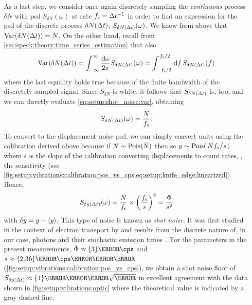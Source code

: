 As a last step, we consider once again discretely sampling the \emph{continuous} process $\delta N$ with \gls{psd} $S_{\delta N}(\omega)$ at rate $f_{\mathrm{s}}=\Delta t^{-1}$ in order to find an expression for the \gls{psd} of the discrete process $\delta N(\Delta t)$, $S_{\delta N(\Delta t)}(\omega)$.
We know from above that $\operatorname{Var}(\delta N(\Delta t)) = \bar{N}$.
On the other hand, recall from \cref{sec:speck:theory:time_series_estimation} that also
\begin{align}\label{eq:setup:shot_noise:var}
    \variance(\delta N(\dt)) = \intinf\ddf{\omega} S_{\delta N(\dt)}(\omega) = \int_{-\flatfrac{\fs}{2}}^{\flatfrac{\fs}{2}}\dd{f} S_{\delta N(\dt)}(f)
\end{align}
where the last equality holds true because of the finite bandwidth of the discretely sampled signal.
Since $S_{\delta N}$ is white, it follows that $S_{\delta N(\Delta t)}$ is, too, and we can directly evaluate \cref{eq:setup:shot_noise:var}, obtaining
\begin{equation}\label{eq:setup:shot_noise:psd}
    S_{\delta N(\Delta t)}(\omega) = \frac{\bar{N}}{f_{\mathrm{s}}}.
\end{equation}
To convert to the displacement noise \gls{psd}, we can simply convert units using the calibration derived above because if $N\sim\operatorname{Pois}(\bar{N})$ then so $y\sim\poisson(\flatfrac{\bar{N}\fs}{s})$ where $s$ is the slope of the calibration converting displacements to count rates, \ie, the sensitivity (see \cref{fig:setup:vibrations:calibration:pos_vs_cps,eq:setup:knife_edge:linearized}).
Hence,
\begin{equation}\label{eq:setup:shot_noise:noise_floor}
   S_{\delta y(\Delta t)}(\omega) = \frac{\bar{N}}{f_{\mathrm{s}}}\times\left(\frac{f_{\mathrm{s}}}{s}\right)^2 = \frac{\bar{\Phi}}{s^2}
\end{equation}
with $\delta y = y - \expval{y}$.
This type of noise is known as \emph{shot noise}.
It was first studied in the context of electron transport by \citet{Schottky1918} and results from the discrete nature of, in our case, photons and their stochastic emission times~\cite{Blanter2000}.
For the parameters in the present measurements, $\bar{\Phi}\approx\qty{3}{\mega\cps}$ and $s\approx\qty{2.36}{\mega\cps\per\micro\meter}$ (\cf \cref{fig:setup:vibrations:calibration:pos_vs_cps}), we obtain a shot noise floor of $S_{\delta y(\dt)}\approx\qty{1}{\nano\meter\per\sqrt{\hertz}}$ in excellent agreement with the data shown in \cref{fig:setup:vibrations:optic} where the theoretical value is indicated by a gray dashed line.

